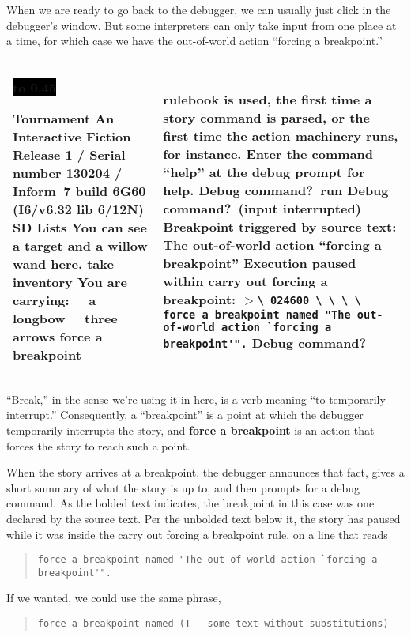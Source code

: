 \documentclass{book}
\newcommand{\n}{\hspace*{\fill}\newline}
\newcommand{\terp}[2]{\begin{center}\begin{tabular}{p{0.45\textwidth}|p{0.45\textwidth}}\midrule #1&#2\\\midrule\end{tabular}\end{center}}
\newcommand{\glkheading}[1]{\textbf{#1}}
\newcommand{\glkinput}[1]{\textbf{#1}}
\newcommand{\glkstatusline}[2]{\centerline{\colorbox{black}{\hbox to 0.45\textwidth{\textcolor{white}{#1\hfil #2}}}}}
\newcommand{\storyprompt}{\raisebox{1.5pt}{\(>\)}}
\newcommand{\cursor}{\raisebox{-1.5pt}{\RectangleThin}}
\newcommand{\markedindent}{\(>\)}
\begin{document}
\pagebreak

When we are ready to go back to the debugger, we can usually just click in the
debugger's window.  But some interpreters can only take input from one place at
a time, for which case we have the out-of-world action ``forcing a breakpoint.''

\terp{\glkstatusline{Lists}{0/2}\n
  \glkheading{Tournament}\n
  An Interactive Fiction\n
  Release 1 / Serial number 130204 / Inform~7 build 6G60 (I6/v6.32 lib 6/12N) SD\n
  \n
  \glkheading{Lists}\n
  You can see a target and a willow wand here.\n
  \n
  \storyprompt\glkinput{take inventory}\n
  You are carrying:\n
  \null\ \ a longbow\n
  \null\ \ three arrows\n
  \n
  \storyprompt\glkinput{force a breakpoint}}{%
  rulebook is used, the first time a story command is parsed, or the first time the action machinery runs, for instance.\n
  \n
  Enter the command ``help'' at the debug prompt for help.\n
  \n
  Debug command?\ \glkinput{run}\n
  \n
  Debug command?\ (input interrupted)\n
  \n
  \glkheading{Breakpoint triggered by source text:} The out-of-world action ``forcing a breakpoint''\n
  \n
  Execution paused within carry out forcing a breakpoint:\n
  \markedindent \lstinline{\ 024600 \ \ \ \ force a breakpoint named "The out-of-world action `forcing a breakpoint'".}\n
  \n
  Debug command?\ \cursor}

``Break,'' in the sense we're using it in here, is a verb meaning ``to
temporarily interrupt.''  Consequently, a ``breakpoint'' is a point at which the
debugger temporarily interrupts the story, and \glkinput{force a breakpoint} is
an action that forces the story to reach such a point.

When the story arrives at a breakpoint, the debugger announces that fact, gives
a short summary of what the story is up to, and then prompts for a debug
command.  As the bolded text indicates, the breakpoint in this case was one
declared by the source text.  Per the unbolded text below it, the story has
paused while it was inside the carry out forcing a breakpoint rule, on a line
that reads

\begin{quote}
  \lstinline{force a breakpoint named "The out-of-world action `forcing a breakpoint'".}
\end{quote}

If we wanted, we could use the same phrase,

\begin{quote}
  \lstinline{force a breakpoint named (T - some text without substitutions)}
\end{quote}
\end{document}
